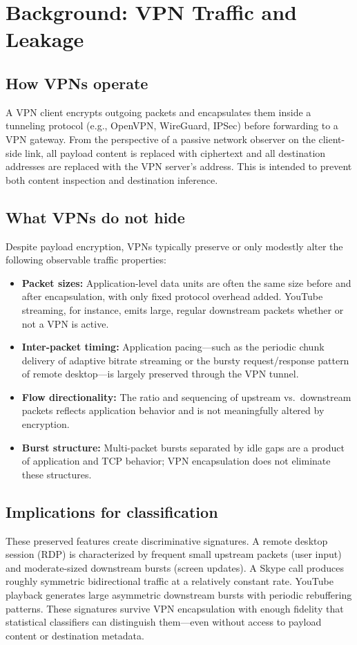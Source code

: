 \documentclass[letterpaper,twocolumn,10pt]{article}
\begin{document}
\section{Background: VPN Traffic and Leakage}

\subsection{How VPNs operate}
A VPN client encrypts outgoing packets and encapsulates them inside a tunneling protocol (e.g., OpenVPN, WireGuard, IPSec) before forwarding to a VPN gateway. From the perspective of a passive network observer on the client-side link, all payload content is replaced with ciphertext and all destination addresses are replaced with the VPN server's address. This is intended to prevent both content inspection and destination inference.

\subsection{What VPNs do not hide}
Despite payload encryption, VPNs typically preserve or only modestly alter the following observable traffic properties:
\begin{itemize}[leftmargin=1.2em]
  \item \textbf{Packet sizes:} Application-level data units are often the same size before and after encapsulation, with only fixed protocol overhead added. YouTube streaming, for instance, emits large, regular downstream packets whether or not a VPN is active.
  \item \textbf{Inter-packet timing:} Application pacing---such as the periodic chunk delivery of adaptive bitrate streaming or the bursty request/response pattern of remote desktop---is largely preserved through the VPN tunnel.
  \item \textbf{Flow directionality:} The ratio and sequencing of upstream vs.\ downstream packets reflects application behavior and is not meaningfully altered by encryption.
  \item \textbf{Burst structure:} Multi-packet bursts separated by idle gaps are a product of application and TCP behavior; VPN encapsulation does not eliminate these structures.
\end{itemize}

\subsection{Implications for classification}
These preserved features create discriminative signatures. A remote desktop session (RDP) is characterized by frequent small upstream packets (user input) and moderate-sized downstream bursts (screen updates). A Skype call produces roughly symmetric bidirectional traffic at a relatively constant rate. YouTube playback generates large asymmetric downstream bursts with periodic rebuffering patterns. These signatures survive VPN encapsulation with enough fidelity that statistical classifiers can distinguish them---even without access to payload content or destination metadata.
\end{document}
